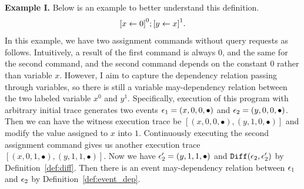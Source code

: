 \textbf{Example I.}
Below is an example to better understand this definition.
\[
 \clabel{\assign{x}{0}}^0;\clabel{\assign{y}{x}}^1.
\]
In this example, we have two assignment commands without query requests as follows. 
Intuitively, a result of the first command is always $0$, and the same for the second command,
and the second command depends on the constant $0$ rather than variable $x$.
However, I aim to capture the dependency 
relation passing through variables, so there is still a variable may-dependency relation between the two labeled
variable $x^0$ and $y^1$.
Specifically,
execution of this program with arbitrary initial trace generates two events $\mathtt{\epsilon}_1 = (x, 0, 0, \bullet)$ and $\mathtt{\epsilon}_2 = (y, 0, 0, \bullet)$.
Then we can have the witness execution trace be $[(x, 0, 0, \bullet), (y, 1, 0, \bullet)]$ and 
modify the value assigned to $x$ into $1$.
Continuously executing the second assignment command gives us another execution trace 
$[(x, 0, 1, \bullet), (y, 1, 1, \bullet)]$.
Now we have $\mathtt{\epsilon}_2' = (y, 1, 1, \bullet)$ and $\mathtt{Diff}(\mathtt{\epsilon}_2, \mathtt{\epsilon}_2')$ by Definition~\ref{def:diff}.
Then there is an event may-dependency relation between $\mathtt{\epsilon}_1$ and $\mathtt{\epsilon}_2$ by Definition~\ref{def:event_dep}.

